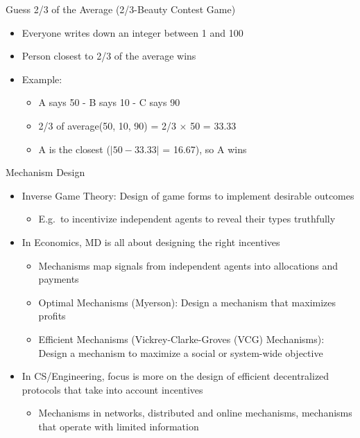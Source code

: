 \documentclass[11pt,aspectratio=169,handout]{beamer}
\begin{document}
  \begin{frame}{Guess 2/3 of the Average (2/3-Beauty Contest Game)}
   \begin{itemize}
    \item Everyone writes down an integer between 1 and 100
    \item Person closest to 2/3 of the average wins
    \pause
    \item Example:
    \begin{itemize}
     \item A says 50 - B says 10 - C says 90
     \item 2/3 of average(50, 10, 90) = 2/3 $\times$ 50 = 33.33
     \item A is the closest ($\vert 50-33.33\vert$ = 16.67), so A wins
    \end{itemize}
   \end{itemize}
  \end{frame}
  
  \begin{frame}{Mechanism Design}
   \begin{itemize}[<+->]
   \setlength{\itemsep}{1em}
    \item {\color{blue} Inverse Game Theory}: Design of game forms to implement desirable outcomes
    \begin{itemize}[<.->]
     \item E.g.\ to incentivize independent agents to reveal their types truthfully
    \end{itemize}
    \item In Economics, MD is all about designing the right incentives
    \begin{itemize}[<.->]
     \item Mechanisms map \alert{signals} from independent agents into allocations and payments
     \item Optimal Mechanisms (Myerson): Design a mechanism that maximizes profits
     \item Efficient Mechanisms (Vickrey-Clarke-Groves (VCG) Mechanisms): Design a mechanism to maximize a \alert{social} or system-wide objective
    \end{itemize}
    \item In CS/Engineering, focus is more on the design of efficient decentralized protocols that take into account incentives
    \begin{itemize}[<.->]
     \item Mechanisms in networks, distributed and online mechanisms, mechanisms that operate with limited information
    \end{itemize}
   \end{itemize}
  \end{frame}
  
\end{document}
